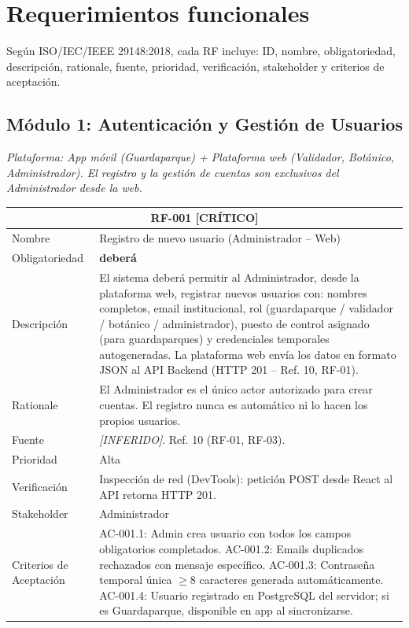 \documentclass[12pt, a4paper]{article}
\newcommand{\criticomark}{\textcolor{criticolor}{\textbf{[CR\'ITICO]}}}
\newcommand{\inferido}{\textcolor{medio}{\textit{[INFERIDO]}}}
\begin{document}
\section{Requerimientos funcionales}

Seg\'un ISO/IEC/IEEE 29148:2018, cada RF incluye: ID, nombre, obligatoriedad, descripci\'on, rationale, fuente, prioridad, verificaci\'on, stakeholder y criterios de aceptaci\'on.

\subsection{M\'odulo 1: Autenticaci\'on y Gesti\'on de Usuarios}

\textit{Plataforma: App m\'ovil (Guardaparque) + Plataforma web (Validador, Bot\'anico, Administrador). El registro y la gesti\'on de cuentas son exclusivos del Administrador desde la web.}

\begin{longtable}{|p{3cm}|p{11.5cm}|}
\hline
\multicolumn{2}{|c|}{\textbf{RF-001} \criticomark} \\
\hline
Nombre & Registro de nuevo usuario (Administrador -- Web) \\
\hline
Obligatoriedad & \textbf{deber\'a} \\
\hline
Descripci\'on & El sistema deber\'a permitir al Administrador, desde la plataforma web, registrar nuevos usuarios con: nombres completos, email institucional, rol (guardaparque / validador / bot\'anico / administrador), puesto de control asignado (para guardaparques) y credenciales temporales autogeneradas. La plataforma web env\'ia los datos en formato JSON al API Backend (HTTP 201 -- Ref. 10, RF-01). \\
\hline
Rationale & El Administrador es el \'unico actor autorizado para crear cuentas. El registro nunca es autom\'atico ni lo hacen los propios usuarios. \\
\hline
Fuente & \inferido{}. Ref. 10 (RF-01, RF-03). \\
\hline
Prioridad & Alta \\
\hline
Verificaci\'on & Inspecci\'on de red (DevTools): petici\'on POST desde React al API retorna HTTP 201. \\
\hline
Stakeholder & Administrador \\
\hline
Criterios de Aceptaci\'on &
AC-001.1: Admin crea usuario con todos los campos obligatorios completados. \newline
AC-001.2: Emails duplicados rechazados con mensaje espec\'ifico. \newline
AC-001.3: Contrase\~na temporal \'unica $\geq$8 caracteres generada autom\'aticamente. \newline
AC-001.4: Usuario registrado en PostgreSQL del servidor; si es Guardaparque, disponible en app al sincronizarse. \\
\hline
\end{longtable}
\end{document}
